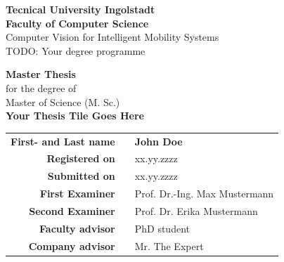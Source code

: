 \begin{titlepage}
	
	\begin{center}	
		\vspace{1cm}
		\huge\textbf{Tecnical University Ingolstadt}\\[1em]
		\Large \textbf{Faculty of Computer Science}\\ 
		\normalsize
		Computer Vision for Intelligent Mobility Systems \\ 
		TODO: Your degree programme \\ [2.5em]
	\end{center}


	\begin{center}	
		\vspace{1cm}
		\Large \textbf{Master Thesis}\\ 
		\normalsize
		for the degree of \\ 
		Master of Science (M. Sc.) \\ [3.5em]
		\huge\textbf{Your Thesis Tile Goes Here}	 \\ [3.5em]
	\end{center}



	
	\begin{center}
		\vspace{1cm}
		\begin{tabular}{r@{:}ll}
			\textbf{First- and Last name} & & \textbf{John Doe}	\\ [3em]
			
			\textbf{Registered on}	& & xx.yy.zzzz	\\ [1em] %
			\textbf{Submitted on}	& & xx.yy.zzzz	\\ [3em] %
			
			\textbf{First Examiner} &	& Prof. Dr.-Ing. Max Mustermann	\\ [1em]
			\textbf{Second Examiner} 	& & Prof. Dr. Erika Mustermann	\\[3em]
			
			\textbf{Faculty advisor} &	& PhD student \\ [1em] %
			\textbf{Company advisor} &	& Mr. The Expert \\ %
		\end{tabular}
	\end{center}
	
\end{titlepage}

\restoregeometry